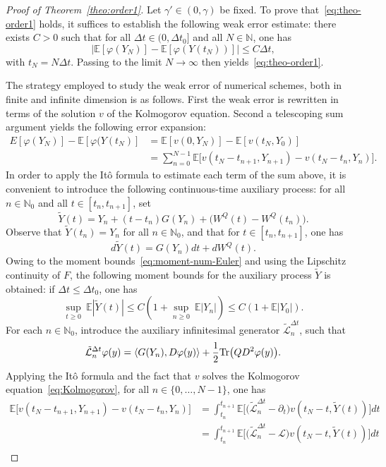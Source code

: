 \documentclass[11pt]{amsart}
\newcommand{\E}{\mathbb{E}}
\newcommand{\N}{\mathbb{N}}
\begin{document}
\begin{proof}[Proof of Theorem~\ref{theo:order1}]
Let $\gamma'\in(0,\gamma)$ be fixed.
%
To prove that~\eqref{eq:theo-order1} holds, it suffices to establish the following weak error estimate: there exists $C>0$ such that for all $\Delta t\in(0,\Delta t_0]$ and all $N\in\N$, one has
\[
\big|\E[\varphi(Y_N)]-\E[\varphi(Y(t_N))]\big|\le C\Delta t,
\]
with $t_N=N\Delta t$. Passing to the limit $N\to\infty$ then yields~\eqref{eq:theo-order1}.


The strategy employed to study the weak error of numerical schemes, both in finite and infinite dimension is as follows. First the weak error is rewritten in terms of the solution $v$ of the Kolmogorov equation. Second a telescoping sum argument yields the following error expansion:
\begin{align*}
E[\varphi(Y_N)]-\E[\varphi(Y(t_N)]&=\E[v(0,Y_N)]-\E[v(t_N,Y_0)]\\
&=\sum_{n=0}^{N-1}\E\bigl[v(t_N-t_{n+1},Y_{n+1})-v(t_N-t_n,Y_n)\bigr].
\end{align*}
In order to apply the It\^o formula to estimate each term of the sum above, it is convenient to introduce the following continuous-time auxiliary process: for all $n\in\N_0$ and all $t\in[t_n,t_{n+1}]$, set
\[
\tilde{Y}(t)=Y_n+(t-t_n)G(Y_n)+\bigl(W^Q(t)-W^Q(t_n)\bigr).
\]
Observe that $\tilde{Y}(t_n)=Y_n$ for all $n\in\N_0$, and that for $t\in[t_n,t_{n+1}]$, one has
\[
d\tilde{Y}(t)=G(Y_n)dt+dW^Q(t).
\]
Owing to the moment bounds~\eqref{eq:moment-num-Euler} and using the Lipschitz continuity of $F$, the following moment bounds for the auxiliary process $\tilde{Y}$ is obtained: if $\Delta t\le \Delta t_0$, one has
\begin{equation}\label{eq:moment_Ytilde}
\underset{t\ge 0}\sup~\E|\tilde{Y}(t)|\le C(1+\underset{n\ge 0}\sup~\E|Y_n|)\le C(1+\E|Y_0|).
\end{equation}
%
For each $n\in\N_0$, introduce the auxiliary infinitesimal generator $\tilde{\mathcal{L}}_n^{\Delta t}$, such that
\[
\tilde{\mathcal{L}}_n^{\Delta t}\varphi(y)=\langle G(Y_n),D\varphi(y)\rangle+\frac{1}{2}{\rm Tr}\bigl(QD^2\varphi(y)\bigr).
\]
Applying the It\^o formula and the fact that $v$ solves the Kolmogorov equation~\eqref{eq:Kolmogorov}, for all $n\in\{0,\ldots,N-1\}$, one has
\begin{align*}
\E\bigl[v(t_N-t_{n+1},Y_{n+1})-v(t_N-t_n,Y_n)\bigr]&=\int_{t_n}^{t_{n+1}}\E\bigl[\bigl(\tilde{\mathcal{L}}_n^{\Delta t}-\partial_t\bigr)v(t_N-t,\tilde{Y}(t))\bigr]dt\\
&=\int_{t_n}^{t_{n+1}}\E\bigl[\bigl(\tilde{\mathcal{L}}_n^{\Delta t}-\mathcal{L}\bigr)v(t_N-t,\tilde{Y}(t))\bigr]dt\\

\end{align*}
\end{proof}
\end{document}
